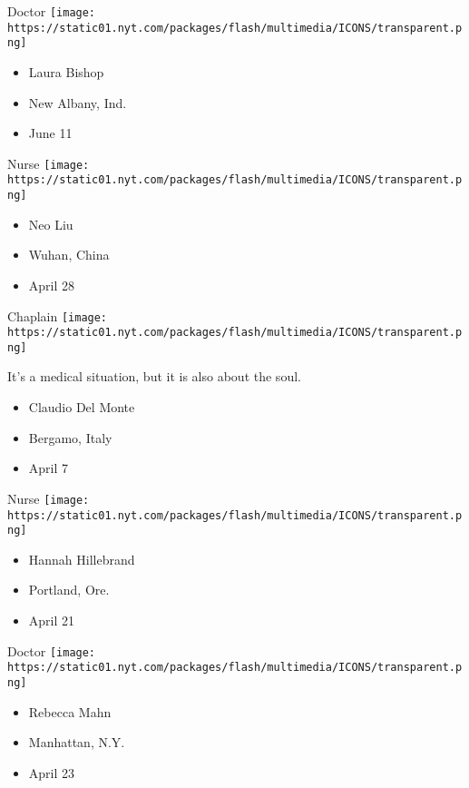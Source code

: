 \protect\hyperlink{item-laura-bishop}{}

Doctor
\texttt{[image: https://static01.nyt.com/packages/flash/multimedia/ICONS/transparent.png]}

\begin{itemize}
\tightlist
\item
  Laura Bishop
\item
  New Albany, Ind.
\item
  June 11
\end{itemize}

\protect\hyperlink{item-neo-liu}{}

Nurse
\texttt{[image: https://static01.nyt.com/packages/flash/multimedia/ICONS/transparent.png]}

\begin{itemize}
\tightlist
\item
  Neo Liu
\item
  Wuhan, China
\item
  April 28
\end{itemize}

\protect\hyperlink{item-claudio-del-monte}{}

Chaplain
\texttt{[image: https://static01.nyt.com/packages/flash/multimedia/ICONS/transparent.png]}

It's a medical situation, but it is also about the soul.

\begin{itemize}
\tightlist
\item
  Claudio Del Monte
\item
  Bergamo, Italy
\item
  April 7
\end{itemize}

\protect\hyperlink{item-hannah-hillebrand}{}

Nurse
\texttt{[image: https://static01.nyt.com/packages/flash/multimedia/ICONS/transparent.png]}

\begin{itemize}
\tightlist
\item
  Hannah Hillebrand
\item
  Portland, Ore.
\item
  April 21
\end{itemize}

\protect\hyperlink{item-rebecca-mahn}{}

Doctor
\texttt{[image: https://static01.nyt.com/packages/flash/multimedia/ICONS/transparent.png]}

\begin{itemize}
\tightlist
\item
  Rebecca Mahn
\item
  Manhattan, N.Y.
\item
  April 23
\end{itemize}

